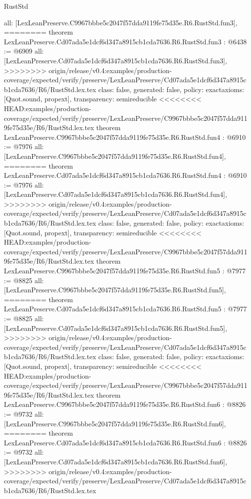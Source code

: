\begin{lexlean}{RustStd}
\begin{coremodule}
{\begin{coremodule}
{{{{{{  all: [LexLeanPreserve.C9967bbbe5c2047f57dda9119fe75d35e.R6.RustStd.fun3],
========
theorem LexLeanPreserve.Cd07ada5e1dcf6d347a8915cb1cda7636.R6.RustStd.fun3 : @6438 := @6909 {
  all: [LexLeanPreserve.Cd07ada5e1dcf6d347a8915cb1cda7636.R6.RustStd.fun3],
>>>>>>>> origin/release/v0.4:examples/production-coverage/expected/verify/preserve/LexLeanPreserve/Cd07ada5e1dcf6d347a8915cb1cda7636/R6/RustStd.lex.tex
  class: false,
  generated: false,
  policy: exact{axioms: [Quot.sound, propext]},
  transparency: semireducible
}
<<<<<<<< HEAD:examples/production-coverage/expected/verify/preserve/LexLeanPreserve/C9967bbbe5c2047f57dda9119fe75d35e/R6/RustStd.lex.tex
theorem LexLeanPreserve.C9967bbbe5c2047f57dda9119fe75d35e.R6.RustStd.fun4 : @6910 := @7976 {
  all: [LexLeanPreserve.C9967bbbe5c2047f57dda9119fe75d35e.R6.RustStd.fun4],
========
theorem LexLeanPreserve.Cd07ada5e1dcf6d347a8915cb1cda7636.R6.RustStd.fun4 : @6910 := @7976 {
  all: [LexLeanPreserve.Cd07ada5e1dcf6d347a8915cb1cda7636.R6.RustStd.fun4],
>>>>>>>> origin/release/v0.4:examples/production-coverage/expected/verify/preserve/LexLeanPreserve/Cd07ada5e1dcf6d347a8915cb1cda7636/R6/RustStd.lex.tex
  class: false,
  generated: false,
  policy: exact{axioms: [Quot.sound, propext]},
  transparency: semireducible
}
<<<<<<<< HEAD:examples/production-coverage/expected/verify/preserve/LexLeanPreserve/C9967bbbe5c2047f57dda9119fe75d35e/R6/RustStd.lex.tex
theorem LexLeanPreserve.C9967bbbe5c2047f57dda9119fe75d35e.R6.RustStd.fun5 : @7977 := @8825 {
  all: [LexLeanPreserve.C9967bbbe5c2047f57dda9119fe75d35e.R6.RustStd.fun5],
========
theorem LexLeanPreserve.Cd07ada5e1dcf6d347a8915cb1cda7636.R6.RustStd.fun5 : @7977 := @8825 {
  all: [LexLeanPreserve.Cd07ada5e1dcf6d347a8915cb1cda7636.R6.RustStd.fun5],
>>>>>>>> origin/release/v0.4:examples/production-coverage/expected/verify/preserve/LexLeanPreserve/Cd07ada5e1dcf6d347a8915cb1cda7636/R6/RustStd.lex.tex
  class: false,
  generated: false,
  policy: exact{axioms: [Quot.sound, propext]},
  transparency: semireducible
}
<<<<<<<< HEAD:examples/production-coverage/expected/verify/preserve/LexLeanPreserve/C9967bbbe5c2047f57dda9119fe75d35e/R6/RustStd.lex.tex
theorem LexLeanPreserve.C9967bbbe5c2047f57dda9119fe75d35e.R6.RustStd.fun6 : @8826 := @9732 {
  all: [LexLeanPreserve.C9967bbbe5c2047f57dda9119fe75d35e.R6.RustStd.fun6],
========
theorem LexLeanPreserve.Cd07ada5e1dcf6d347a8915cb1cda7636.R6.RustStd.fun6 : @8826 := @9732 {
  all: [LexLeanPreserve.Cd07ada5e1dcf6d347a8915cb1cda7636.R6.RustStd.fun6],
>>>>>>>> origin/release/v0.4:examples/production-coverage/expected/verify/preserve/LexLeanPreserve/Cd07ada5e1dcf6d347a8915cb1cda7636/R6/RustStd.lex.tex
}}}}}}}}}}
\end{coremodule}}
\end{coremodule}
\end{lexlean}
